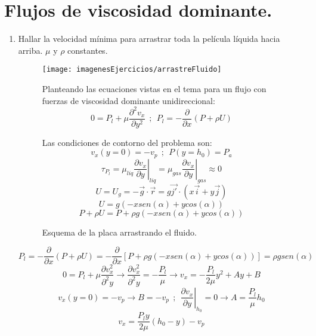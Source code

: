 \section{Flujos de viscosidad dominante.}
\begin{enumerate}
	\item Hallar la velocidad mínima para arrastrar toda la película líquida hacia arriba. $\mu$ y $\rho$ constantes.
	\begin{figure}[H]
		\begin{minipage}{0.45\textwidth}
		\centering
		\texttt{[image: imagenesEjercicios/arrastreFluido]}
		\caption{Esquema de la placa arrastrando el fluido.}
		\label{fig:arrastrefluido}
	\end{minipage}%
	\begin{minipage}{0.55\textwidth}
	\blue
	Planteando las ecuaciones vistas en el tema para un flujo con fuerzas de viscosidad dominante unidireccional:
	\[0=P_l+\mu\dfrac{\partial^2 v_x}{\partial y^2}\ \ ; \ \ P_l=-\dfrac{\partial }{\partial x}\left(P+\rho U \right)\]
	
	Las condiciones de contorno del problema son:
	\[v_x(y=0)=-v_p \ \ ; \ \ P(y=h_0)=P_a\]
	\[ \tau_{P_{l}}=\mu_{liq} \left. \dfrac{\partial v_x}{\partial y} \right|_{liq} =\mu_{gas} \left. \dfrac{\partial v_x}{\partial y} \right|_{gas} \approx 0\]
	\[U=U_g=-\vec{g}\cdot \vec{r}=g\vec{j'}\cdot
	\left(x\vec{i}+y\vec{j}\right)\]
	\[U= g\left(-x sen(\alpha)+ycos(\alpha)\right)\]
	\[P+\rho U=P+\rho g\left(-x sen(\alpha)+ycos(\alpha)\right)\]
	\end{minipage}
	\end{figure}
	\blue
	\[P_l=-\dfrac{\partial }{\partial x}\left(P+\rho U\right)=
	-\dfrac{\partial }{\partial x}\left[P+\rho g\left(-x sen(\alpha)+ycos(\alpha)\right)\right]=\rho gsen(\alpha)\]	
	\[0=P_l+\mu\dfrac{\partial v_x^2}{\partial^2 y}\rightarrow \dfrac{\partial v_x^2}{\partial^2 y}=-\dfrac{P_l}{\mu}\rightarrow v_x=-\dfrac{P_l}{2\mu}y^2+Ay+B\]
	\[v_x(y=0)=-v_p\rightarrow B=-v_p \ \ ; \ \ \left. \dfrac{\partial v_x}{\partial y} \right|_{h_0}=0 \rightarrow A=\dfrac{P_l}{\mu}h_0\]
	\[v_x=\dfrac{P_l y}{2\mu}\left(h_0-y\right)-v_p\]
	

\end{enumerate}
